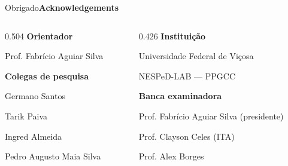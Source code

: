 \documentclass{beamer}
\begin{document}
{
\specialframe
\begin{frame}{Obrigado}{\textbf{Acknowledgements}}
    \vfill
    \vspace{-6mm}
    \begin{columns}[T,onlytextwidth]
        \begin{column}{0.504\textwidth}
            {\large\textbf{Orientador}}\par\smallskip
            Prof. Fabrício Aguiar Silva

            \bigskip
            {\large\textbf{Colegas de pesquisa}}\par\smallskip
            Germano Santos\par
            Tarik Paiva\par
            Ingred Almeida\par
            Pedro Augusto Maia Silva
        \end{column}
        \hfill
        \begin{column}{0.426\textwidth}
            {\large\textbf{Instituição}}\par\smallskip
            Universidade Federal de Viçosa\par
            NESPeD-LAB --- PPGCC

            \bigskip
            {\large\textbf{Banca examinadora}}\par\smallskip
            Prof. Fabrício Aguiar Silva {\small(presidente)}\par
            Prof. Clayson Celes {\small(ITA)}\par
            Prof. Alex Borges
        \end{column}
    \end{columns}
    \vfill
\end{frame}
}
\end{document}
